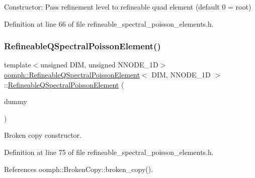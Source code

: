 Constructor\+: Pass refinement level to refineable quad element (default 0 = root) 



Definition at line 66 of file refineable\+\_\+spectral\+\_\+poisson\+\_\+elements.\+h.

\mbox{\label{classoomph_1_1RefineableQSpectralPoissonElement_a82b24be285a5709ecfb0f9bbbc0e1bed}} 
\subsubsection{\texorpdfstring{Refineable\+Q\+Spectral\+Poisson\+Element()}{RefineableQSpectralPoissonElement()}\hspace{0.1cm}{\footnotesize\ttfamily [2/2]}}
{\footnotesize\ttfamily template$<$unsigned D\+IM, unsigned N\+N\+O\+D\+E\+\_\+1D$>$ \\
\hyperlink{classoomph_1_1RefineableQSpectralPoissonElement}{oomph\+::\+Refineable\+Q\+Spectral\+Poisson\+Element}$<$ D\+IM, N\+N\+O\+D\+E\+\_\+1D $>$\+::\hyperlink{classoomph_1_1RefineableQSpectralPoissonElement}{Refineable\+Q\+Spectral\+Poisson\+Element} (\begin{DoxyParamCaption}\item[{const \hyperlink{classoomph_1_1RefineableQSpectralPoissonElement}{Refineable\+Q\+Spectral\+Poisson\+Element}$<$ D\+IM, N\+N\+O\+D\+E\+\_\+1D $>$ \&}]{dummy }\end{DoxyParamCaption})\hspace{0.3cm}{\ttfamily [inline]}}



Broken copy constructor. 



Definition at line 75 of file refineable\+\_\+spectral\+\_\+poisson\+\_\+elements.\+h.



References oomph\+::\+Broken\+Copy\+::broken\+\_\+copy().



